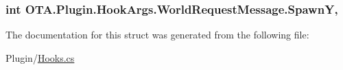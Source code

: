 \subsubsection[{Spawn\+Y}]{\setlength{\rightskip}{0pt plus 5cm}int O\+T\+A.\+Plugin.\+Hook\+Args.\+World\+Request\+Message.\+Spawn\+Y\hspace{0.3cm}{\ttfamily [get]}, {\ttfamily [set]}}\label{struct_o_t_a_1_1_plugin_1_1_hook_args_1_1_world_request_message_acd093709cbbef8c4d0e0bc2d2bd13b46}


The documentation for this struct was generated from the following file\+:\begin{DoxyCompactItemize}
\item 
Plugin/\hyperlink{_hooks_8cs}{Hooks.\+cs}\end{DoxyCompactItemize}
